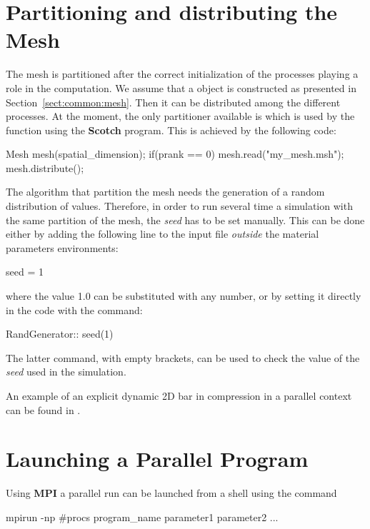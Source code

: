 \section{Partitioning and distributing the Mesh}

The mesh is partitioned after the correct initialization of the processes
playing a role in the computation. We assume that a  object is
constructed as presented in Section~\ref{sect:common:mesh}.  Then it can be
distributed among the different processes. At the moment, the only partitioner
available is  which is used by the function
 using the \textbf{Scotch}\cite{scotch} program.  This is
achieved by the following code:

\begin{cpp}
  Mesh mesh(spatial_dimension);
  if(prank == 0) {
    mesh.read("my_mesh.msh");
  }
  mesh.distribute();
\end{cpp}

The algorithm that partition the mesh needs the generation of a random
distribution of values. Therefore, in order to run several time a
simulation with the same partition of the mesh, the \emph{seed} has to
be set manually.  This can be done either by adding the following line
to the input file \emph{outside} the material parameters environments:
\begin{cpp}
  seed = 1
\end{cpp}
where the value 1.0 can be substituted with any number, or by setting
it directly in the code with the command:
\begin{cpp}
  RandGenerator:: seed(1)
\end{cpp}
The latter command, with empty brackets, can be used to check the value
of the \emph{seed} used in the simulation.


An example of an explicit dynamic 2D bar in compression in a parallel
context can be found in .

\section{Launching a Parallel Program}

Using \textbf{MPI} a parallel run can be launched from a shell
using the command

\begin{cpp}
  mpirun -np #procs program_name parameter1 parameter2 ...
\end{cpp}

